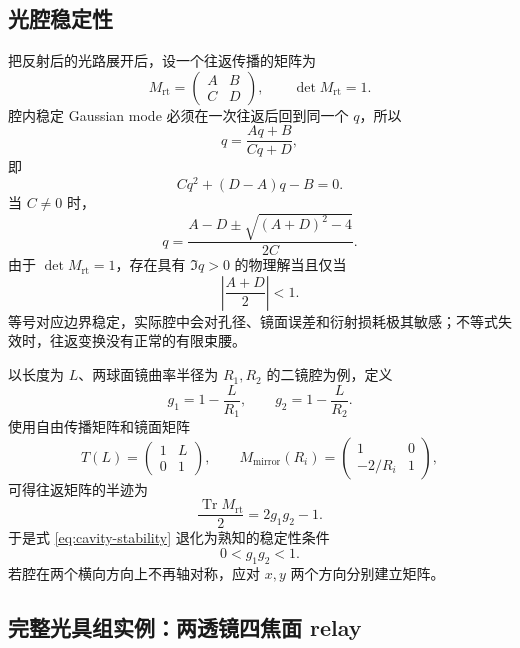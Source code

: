 \subsection{光腔稳定性}

把反射后的光路展开后，设一个往返传播的矩阵为
\begin{equation}
	M_{\mathrm{rt}}=
	\begin{pmatrix}
	A&B\\C&D
	\end{pmatrix},
\qquad
\det M_{\mathrm{rt}}=1.
\end{equation}
腔内稳定 Gaussian mode 必须在一次往返后回到同一个 \(q\)，所以
\begin{equation}
	q=\frac{Aq+B}{Cq+D},
\end{equation}
即
\begin{equation}
	Cq^2+(D-A)q-B=0.
\end{equation}
当 \(C\neq0\) 时，
\begin{equation}
	q=\frac{A-D\pm\sqrt{(A+D)^2-4}}{2C}.
\end{equation}
由于 \(\det M_{\mathrm{rt}}=1\)，存在具有 \(\Im q>0\) 的物理解当且仅当
\begin{equation}
	\left|\frac{A+D}{2}\right|<1.
\label{eq:cavity-stability}
\end{equation}
等号对应边界稳定，实际腔中会对孔径、镜面误差和衍射损耗极其敏感；不等式失效时，往返变换没有正常的有限束腰。

以长度为 \(L\)、两球面镜曲率半径为 \(R_1,R_2\) 的二镜腔为例，定义
\begin{equation}
	g_1=1-\frac{L}{R_1},\qquad
	g_2=1-\frac{L}{R_2}.
\end{equation}
使用自由传播矩阵和镜面矩阵
\[
	T(L)=\begin{pmatrix}1&L\\0&1\end{pmatrix},
\qquad
	M_{\mathrm{mirror}}(R_i)=
	\begin{pmatrix}1&0\\-2/R_i&1\end{pmatrix},
\]
可得往返矩阵的半迹为
\begin{equation}
	\frac{\operatorname{Tr}M_{\mathrm{rt}}}{2}=2g_1g_2-1.
\end{equation}
于是式 \eqref{eq:cavity-stability} 退化为熟知的稳定性条件
\begin{equation}
	0<g_1g_2<1.
\end{equation}
若腔在两个横向方向上不再轴对称，应对 \(x,y\) 两个方向分别建立矩阵。

\subsection{完整光具组实例：两透镜四焦面 relay}

